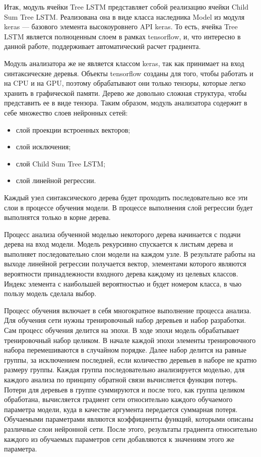 Итак, модуль ячейки Tree LSTM представляет собой реализацию ячейки Child Sum Tree LSTM. Реализована она в виде класса наследника Model из модуля keras --- базового элемента высокоуровнего API keras. То есть, ячейка Tree LSTM является полноценным слоем в рамках tensorflow, и, что интересно в данной работе, поддерживает автоматический расчет градиента.

Модуль анализатора же не является классом keras, так как принимает на вход синтаксические деревья. Объекты tensorflow созданы для того, чтобы работать и на CPU и на GPU, поэтому обрабатывают они только тензоры, которые легко хранить в графической памяти. Дерево же довольно сложная структура, чтобы представить ее в виде тензора. Таким образом, модуль анализатора содержит в себе множество слоев нейронных сетей:

\begin{itemize}
\item слой проекции встроенных векторов;
\item слой исключения;
\item слой Child Sum Tree LSTM;
\item слой линейной регрессии.
\end{itemize}

Каждый узел синтаксического дерева будет проходить последовательно все эти слои в процессе обучения модели. В процессе выполнения слой регрессии будет выполнятся только в корне дерева.

Процесс анализа обученной моделью некоторого дерева начинается с подачи дерева на вход модели. Модель рекурсивно спускается к листьям дерева и выполняет последовательно слои модели на каждом узле. В результате работы на выходе линейной регрессии получается вектор, элементами которого являются вероятности принадлежности входного дерева каждому из целевых классов. Индекс элемента с наибольшей вероятностью и будет номером класса, в чью пользу модель сделала выбор.

Процесс обучения включает в себя многократное выполнение процесса анализа. Для обучения сети нужны тренировочный набор деревьев и набор разработки. Сам процесс обучения делится на эпохи. В ходе эпохи модель обрабатывает тренировочный набор целиком. В начале каждой эпохи элементы тренировочного набора перемешиваются в случайном порядке. Далее набор делится на равные группы, за исключением последней, если количество деревьев в наборе не кратно размеру группы. Каждая группа последовательно анализируется моделью, для каждого анализа по принципу обратной связи вычисляется функция потерь. Потери для деревьев в группе суммируются и после того, как группа целиком обработана, вычисляется градиент сети относительно каждого обучаемого параметра модели, куда в качестве аргумента передается суммарная потеря. Обучаемыми параметрами являются коэффициенты функций, которыми описаны различные слои нейронной сети. После этого, результаты градиента относительно каждого из обучаемых параметров сети добавляются к значениям этого же параметра.

